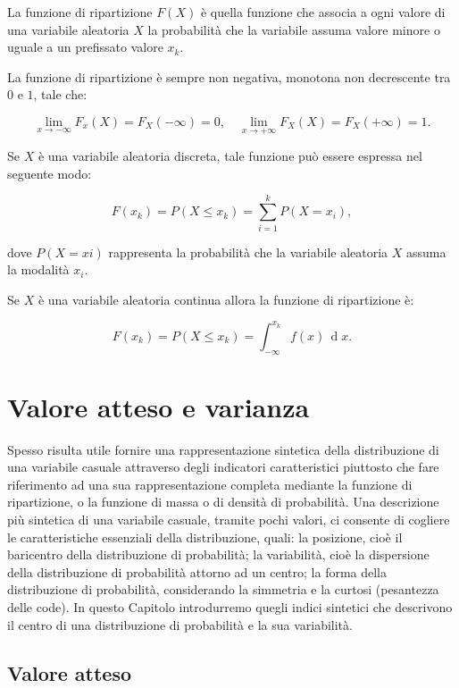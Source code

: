 \documentclass[
  11pt,
]{krantz}
\theoremstyle{definition}
\theoremstyle{definition}
\theoremstyle{definition}
\theoremstyle{definition}
\theoremstyle{remark}
\begin{document}
La funzione di ripartizione \(F(X)\) è quella funzione che associa a ogni valore di una variabile aleatoria \(X\) la probabilità che la variabile assuma valore minore o uguale a un prefissato valore \(x_k\).

La funzione di ripartizione è sempre non negativa, monotona non decrescente tra \(0\) e \(1\), tale che:

\[
\lim_{x \to -\infty} F_x(X) = F_X(-\infty) = 0, \quad \lim_{x \to +\infty} F_X(X) = F_X(+\infty) = 1.
\]

Se \(X\) è una variabile aleatoria discreta, tale funzione può essere espressa nel seguente modo:

\[
F(x_k) = P(X \leq x_k) = \sum_{i=1}^k P(X = x_i),
\]

dove \(P(X = xi)\) rappresenta la probabilità che la variabile aleatoria \(X\) assuma la modalità \(x_i\).

Se \(X\) è una variabile aleatoria continua allora la funzione di ripartizione è:

\[
F(x_k) = P(X \leq x_k) = \int_{-\infty}^{x_k} f(x) \,\operatorname {d}\!x .
\]

\hypertarget{exp-val-and-variance-rv}{%
\chapter{Valore atteso e varianza}\label{exp-val-and-variance-rv}}

Spesso risulta utile fornire una rappresentazione sintetica della distribuzione di una variabile casuale attraverso degli indicatori caratteristici piuttosto che fare riferimento ad una sua rappresentazione completa mediante la funzione di ripartizione, o la funzione di massa o di densità di probabilità. Una descrizione più sintetica di una variabile casuale, tramite pochi valori, ci consente di cogliere le caratteristiche essenziali della distribuzione, quali: la posizione, cioè il baricentro della distribuzione di probabilità; la variabilità, cioè la dispersione della distribuzione di probabilità attorno ad un centro; la forma della distribuzione di probabilità, considerando la simmetria e la curtosi (pesantezza delle code). In questo Capitolo introdurremo quegli indici sintetici che descrivono il centro di una distribuzione di probabilità e la sua variabilità.

\hypertarget{valore-atteso}{%
\section{Valore atteso}\label{valore-atteso}}
\end{document}
